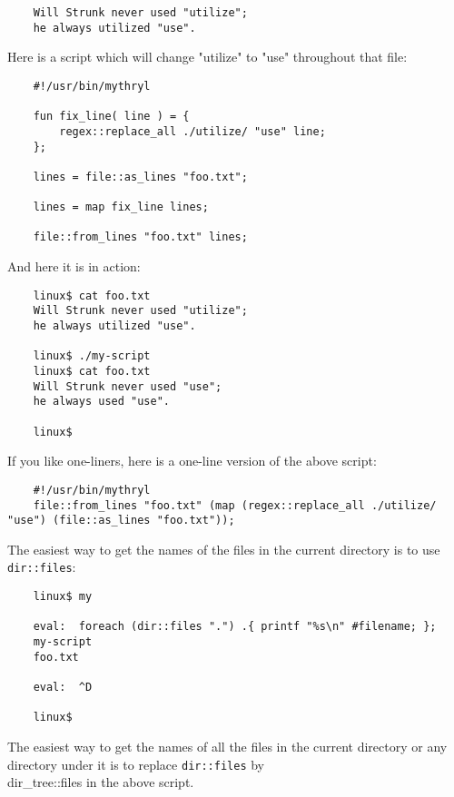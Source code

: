 \begin{verbatim}
    Will Strunk never used "utilize";
    he always utilized "use".
\end{verbatim}

Here is a script which will change "utilize" to "use" 
throughout that file: 

\begin{verbatim}
    #!/usr/bin/mythryl

    fun fix_line( line ) = {
        regex::replace_all ./utilize/ "use" line;
    };

    lines = file::as_lines "foo.txt";

    lines = map fix_line lines;

    file::from_lines "foo.txt" lines;
\end{verbatim}

And here it is in action:

\begin{verbatim}
    linux$ cat foo.txt
    Will Strunk never used "utilize";
    he always utilized "use".

    linux$ ./my-script
    linux$ cat foo.txt
    Will Strunk never used "use";
    he always used "use".

    linux$
\end{verbatim}

If you like one-liners, here is a one-line version of the above script:

\begin{verbatim}
    #!/usr/bin/mythryl
    file::from_lines "foo.txt" (map (regex::replace_all ./utilize/ "use") (file::as_lines "foo.txt"));
\end{verbatim}

The easiest way to get the names of the files in the current 
directory is to use {\tt dir::files}:

\begin{verbatim}
    linux$ my

    eval:  foreach (dir::files ".") .{ printf "%s\n" #filename; };
    my-script
    foo.txt

    eval:  ^D

    linux$
\end{verbatim}

The easiest way to get the names of all the files in the 
current directory or any directory under it is to replace 
{\tt dir::files} by {\\dir\_tree::files} in the above script.

\cutend*


